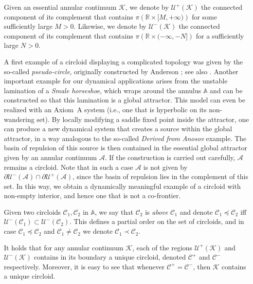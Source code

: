 \documentclass[12pt,a4paper]{amsart}
\theoremstyle{definition}
\theoremstyle{remark}
\newcommand{\R}{\mathbb{R}}
\newcommand{\A}{\mathbb{A}}
\begin{document}
\smallskip

Given an essential annular continuum $\mathcal{K}$, we denote by $\mathcal{U}^+(\mathcal{K})$ the connected component of its complement that contains $\pi(\R\times{[M, +\infty)})$ for some sufficiently large $M>0$. Likewise, we denote
by $\mathcal{U}^-(\mathcal{K})$ the connected component of its complement that contains $\pi(\R\times{(-\infty, -N]})$ for a sufficiently large $N>0$.

A first example of a circloid displaying a complicated topology was given by the so-called \emph{pseudo-circle}, originally constructed by Anderson \cite{andersonpc}; see also \cite{bingpc}. Another important example for our dynamical applications arises from the unstable lamination of a \emph{Smale horseshoe}, which wraps around the annulus $\mathbb{A}$ and can be constructed so that this lamination is a global attractor. This model can even be realized with an Axiom~A system (i.e., one that is hyperbolic on its non-wandering set). By locally modifying a saddle fixed point inside the attractor, one can produce a new dynamical system that creates a source within the global attractor, in a way analogous to the so-called \emph{Derived from Anosov} example. The basin of repulsion of this source is then contained in the essential global attractor given by an annular continuum $\mathcal{A}$. If the construction is carried out carefully, $\mathcal{A}$ remains a circloid. Note that in such a case $\mathcal{A}$ is not given by $\partial \mathcal{U}^-(\mathcal{A}) \cap \partial \mathcal{U}^+(\mathcal{A})$, since the basin of repulsion lies in the complement of this set. In this way, we obtain a dynamically meaningful example of a circloid with non-empty interior, and hence one that is not a co-frontier.


\smallskip


Given two circloids $\mathcal{C}_1, \mathcal{C}_2$  in $\A$, we say that
$\mathcal{C}_2$ is \emph{above} $\mathcal{C}_1$ and denote
$\mathcal{C}_1\preccurlyeq \mathcal{C}_2$ iff $\mathcal{U}^-(\mathcal{C}_1)\subset \mathcal{U}^-(\mathcal{C}_2)$. This defines a partial order on the set of circloids,
and in case $\mathcal{C}_1\preccurlyeq \mathcal{C}_2$ and $\mathcal{C}_1\neq\mathcal{C}_2$
we denote $\mathcal{C}_1\prec\mathcal{C}_2$.

It holds that for any annular continuum $\mathcal{K}$, each of the regions $\mathcal{U}^+(\mathcal{K})$ and $\mathcal{U}^-(\mathcal{K})$ contains in its boundary a unique circloid, denoted $\mathcal{C}^+$ and $\mathcal{C}^{-}$ respectively. Moreover, it is easy to see that whenever $\mathcal{C}^+=\mathcal{C}^-$, then $\mathcal{K}$ contains a unique circloid.
\end{document}
